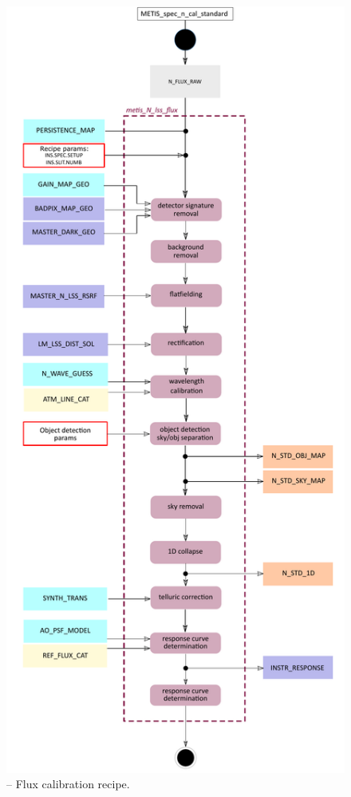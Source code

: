 \begin{figure}[ht]
  \centering
  \includegraphics[width=0.4\textheight]{figures/metis_N_lss_flux_v0.71.pdf}
  \caption[Recipe: ]{ --
    Flux calibration recipe.}
  \label{Fig:rec_N_lss_flux}
\end{figure}
